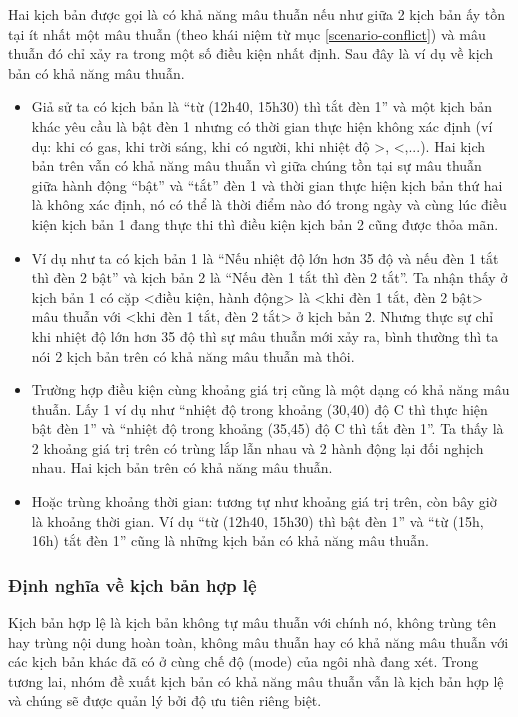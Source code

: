 \documentclass[12pt,a4paper,oneside]{extbook}
\begin{document}
Hai kịch bản được gọi là có khả năng mâu thuẫn nếu như giữa 2 kịch bản ấy tồn tại ít nhất một mâu thuẫn (theo khái niệm từ mục \ref{scenario-conflict}) và mâu thuẫn đó chỉ xảy ra trong một số điều kiện nhất định. Sau đây là ví dụ về kịch bản có khả năng mâu thuẫn.

	\begin{itemize}[topsep=1mm,itemsep=-0.5mm]
	\item Giả sử ta có kịch bản là “từ (12h40, 15h30) thì tắt đèn 1” và một kịch bản khác yêu cầu là bật đèn 1 nhưng có thời gian thực hiện không xác định (ví dụ: khi có gas, khi trời sáng, khi có người, khi nhiệt độ >, <,...). Hai kịch bản trên vẫn có khả năng mâu thuẫn vì giữa chúng tồn tại sự mâu thuẫn giữa hành động “bật” và “tắt” đèn 1 và thời gian thực hiện kịch bản thứ hai là không xác định, nó có thể là thời điểm nào đó trong ngày và cùng lúc điều kiện kịch bản 1 đang thực thi thì điều kiện kịch bản 2 cũng được thỏa mãn.
	\item Ví dụ như ta có kịch bản 1 là “Nếu nhiệt độ lớn hơn 35 độ và nếu đèn 1 tắt thì đèn 2 bật” và kịch bản 2 là “Nếu đèn 1 tắt thì đèn 2 tắt”. Ta nhận thấy ở kịch bản 1 có cặp <điều kiện, hành động> là <khi đèn 1 tắt, đèn 2 bật> mâu thuẫn với <khi đèn 1 tắt, đèn 2 tắt> ở kịch bản 2. Nhưng thực sự chỉ khi nhiệt độ lớn hơn 35 độ thì sự mâu thuẫn mới xảy ra, bình thường thì ta nói 2 kịch bản trên có khả năng mâu thuẫn mà thôi. 
	\item Trường hợp điều kiện cùng khoảng giá trị cũng là một dạng có khả năng mâu thuẫn. Lấy 1 ví dụ như “nhiệt độ trong khoảng (30,40) độ C thì thực hiện bật đèn 1” và “nhiệt độ trong khoảng (35,45) độ C thì tắt đèn 1”. Ta thấy là 2 khoảng giá trị trên có trùng lắp lẫn nhau và 2 hành động lại đối nghịch nhau. Hai kịch bản trên có khả năng mâu thuẫn.
	\item Hoặc trùng khoảng thời gian: tương tự như khoảng giá trị trên, còn bây giờ là khoảng thời gian. Ví dụ “từ (12h40, 15h30) thì bật đèn 1” và “từ (15h, 16h) tắt đèn 1” cũng là những kịch bản có khả năng mâu thuẫn.
	\vspace{1mm}
	\end{itemize}
	
\subsubsection{Định nghĩa về kịch bản hợp lệ}

Kịch bản hợp lệ là kịch bản không tự mâu thuẫn với chính nó, không trùng tên hay trùng nội dung hoàn toàn, không mâu thuẫn hay có khả năng mâu thuẫn với các kịch bản khác đã có ở cùng chế độ (mode) của ngôi nhà đang xét. Trong tương lai, nhóm đề xuất kịch bản có khả năng mâu thuẫn vẫn là kịch bản hợp lệ và chúng sẽ được quản lý bởi độ ưu tiên riêng biệt.
\end{document}
